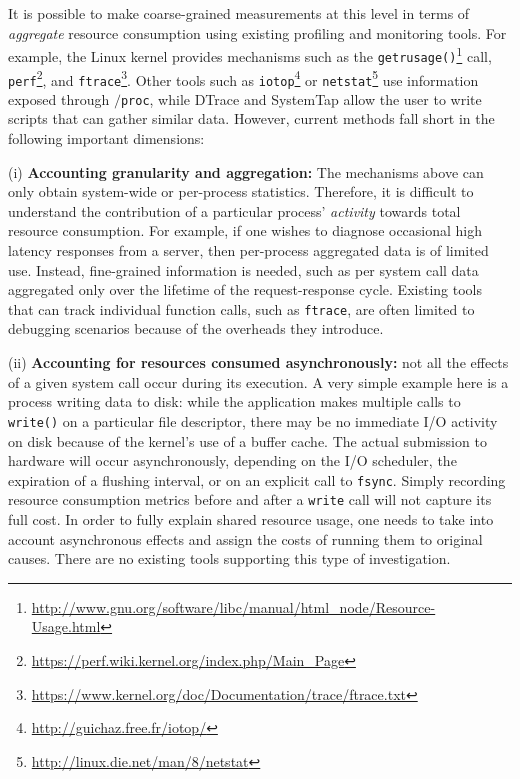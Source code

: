 \documentclass[letterpaper,twocolumn,10pt]{article}
\begin{document}
It is possible to make coarse-grained measurements at this level in terms of
\textit{aggregate} resource consumption using existing profiling and monitoring
tools. For example, the Linux kernel provides mechanisms such as the
\texttt{getrusage()}\footnote{\url{http://www.gnu.org/software/libc/manual/html_node/Resource-Usage.html}} call, \texttt{perf}\footnote{\url{https://perf.wiki.kernel.org/index.php/Main_Page}}, and \texttt{ftrace}\footnote{\url{https://www.kernel.org/doc/Documentation/trace/ftrace.txt}}. Other tools such
as \texttt{iotop}\footnote{\url{http://guichaz.free.fr/iotop/}} or \texttt{netstat}\footnote{\url{http://linux.die.net/man/8/netstat}} use information exposed through
\texttt{$/$proc}, while DTrace \cite{dtrace} and SystemTap \cite{systap} allow the user to write scripts that can gather
similar data. However, current methods fall short in the following important
dimensions:

(i) \textbf{Accounting granularity and aggregation:} The mechanisms
above can only obtain system-wide or per-process statistics. Therefore, it is
difficult to understand the contribution of a particular process'
\textit{activity} towards total resource consumption. For example, if one
wishes to diagnose occasional high latency responses from a server, then
per-process aggregated data is of limited use. Instead, fine-grained information is
needed, such as per system call data aggregated only over the lifetime of the
request-response cycle. Existing tools that can track individual function calls,
such as \texttt{ftrace}, are often limited to debugging scenarios because of the overheads
they introduce.

(ii) \textbf{Accounting for resources consumed asynchronously:} not all the
effects of a given system call occur during its execution. A very simple example
here is a process writing data to disk: while the application makes multiple
calls to \texttt{write()} on a particular file descriptor, there may be no
immediate I/O activity on disk because of the kernel's use of a buffer cache.
The actual submission to hardware will occur asynchronously, depending on the
I/O scheduler, the expiration of a flushing interval, or on an explicit call to
\texttt{fsync}. Simply recording resource consumption metrics before and after a
\texttt{write} call will not capture its full cost. In order to fully explain
shared resource usage, one needs to take into account asynchronous effects and
assign the costs of running them to original causes. There are no existing tools
supporting this type of investigation.
\end{document}

